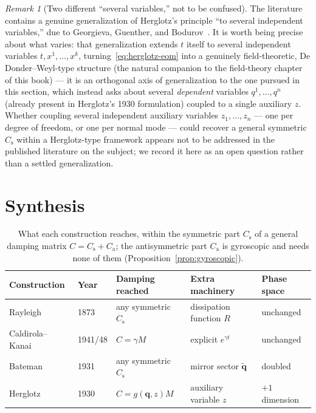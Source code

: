 \documentclass[12pt]{book}
\theoremstyle{definition}
\theoremstyle{remark}
\newtheorem{remark}[proposition]{Remark}
\newcommand{\vq}{\mathbf{q}}
\newcommand{\qt}{\tilde{\vq}}
\newcommand{\Mm}{M}
\newcommand{\Cc}{C}
\newcommand{\Cs}{C_{\mathrm s}}
\newcommand{\Ca}{C_{\mathrm a}}
\begin{document}
\begin{remark}[Two different ``several variables,'' not to be confused]
\label{rem:several-variables}
The literature contains a genuine generalization of Herglotz's principle ``to several independent variables,'' due to Georgieva, Guenther, and Bodurov~\cite{GeorgievaGuentherBodurov2003}. It is worth being precise about what varies: that generalization extends $t$ itself to several independent variables $t,x^1,\dots,x^k$, turning~\eqref{eq:herglotz-eom} into a genuinely field-theoretic, De Donder--Weyl-type structure (the natural companion to the field-theory chapter of this book) --- it is an orthogonal axis of generalization to the one pursued in this section, which instead asks about several \emph{dependent} variables $q^1,\dots,q^n$ (already present in Herglotz's 1930 formulation) coupled to a single auxiliary $z$. Whether coupling several independent auxiliary variables $z_1,\dots,z_n$ --- one per degree of freedom, or one per normal mode --- could recover a general symmetric $\Cs$ within a Herglotz-type framework appears not to be addressed in the published literature on the subject; we record it here as an open question rather than a settled generalization.
\end{remark}

\section{Synthesis}
\label{sec:synthesis}

\begin{table}[h]
\centering
\small
\renewcommand{\arraystretch}{1.35}
\begin{tabular}{@{}lllll@{}}
\toprule
Construction & Year & Damping reached & Extra machinery & Phase space \\
\midrule
Rayleigh~\cite{Rayleigh1873} & 1873 & any symmetric $\Cs$ & dissipation function $R$ & unchanged \\
Caldirola--Kanai~\cite{Caldirola1941,Kanai1948} & 1941/48 & $\Cc=\gamma\Mm$ & explicit $e^{\gamma t}$ & unchanged \\
Bateman~\cite{Bateman1931} & 1931 & any symmetric $\Cs$ & mirror sector $\qt$ & doubled \\
Herglotz~\cite{Herglotz1930} & 1930 & $\Cc=g(\vq,z)\Mm$ & auxiliary variable $z$ & $+1$ dimension \\
\bottomrule
\end{tabular}
\caption{What each construction reaches, within the symmetric part $\Cs$ of a general damping matrix $\Cc=\Cs+\Ca$; the antisymmetric part $\Ca$ is gyroscopic and needs none of them (Proposition~\ref{prop:gyroscopic}).}
\label{tab:comparison}
\end{table}
\end{document}
